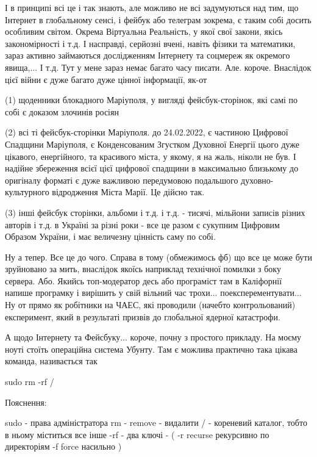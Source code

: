 І в принципі всі це і так знають, але можливо не всі задумуються над тим, що
Інтернет в глобальному сенсі, і фейбук або телеграм зокрема, є таким собі
досить особливим світом. Окрема Віртуальна Реальність, у якої свої закони,
якісь закономірності і т.д. І насправді, серйозні вчені, навіть фізики та
математики, зараз активно займаються дослідженням Інтернету та соцмереж як
окремого явища,... І т.д. Тут у мене зараз немає багато часу писати. Але.
короче. Внаслідок цієї війни є дуже багато дуже цінної інформації, як-от 

(1) щоденники блокадного Маріуполя, у вигляді фейсбук-сторінок, які самі по
собі є доказом злочинів росіян

(2) всі ті фейсбук-сторінки Маріуполя. до 24.02.2022, є частиною Цифрової
Спадщини Маріуполя, є Конденсованим Згустком Духовної Енергії цього дуже
цікавого, енергійного, та красивого міста, у якому, я на жаль, ніколи не був.
І надійне збереження всієї цієї цифрової спадщини в максимально близькому до
оригіналу форматі є дуже важливою передумовою подальшого духовно-культурного
відродження Міста Марії. Це дійсно так.

(3) інші фейсбук сторінки, альбоми і т.д. і т.д. - тисячі, мільйони записів
різних авторів і т.д. в Україні за різні роки - все це разом є сукупним
Цифровим Образом України, і має величезну цінність саму по собі. 

Ну а тепер. Все це до чого. Справа в тому (обмежимось фб) що все це може бути
зруйновано за мить, внаслідок якоїсь наприклад технічної помилки з боку
сервера. Або. Якийсь топ-модератор десь або програміст там в Каліфорнії напише
програмку і вирішить у свій вільний час трохи... поексперементувати... Ну от
прямо як робітники на ЧАЕС, які проводили (начебто контрольований) експеримент,
який в результаті призвів до глобальної ядерної катастрофи.

А щодо Інтернету та Фейсбуку... короче, почну з простого прикладу. На моєму
ноуті стоїть операційна система Убунту. Там є можлива практично така цікава команда,
називається так

sudo rm -rf /

Пояснення:

sudo - права адміністратора
rm - remove - видалити
/  - кореневий каталог, тобто в ньому міститься все інше
-rf - два ключі - ( -r recurse рекурсивно по директоріям -f force насильно ) 

